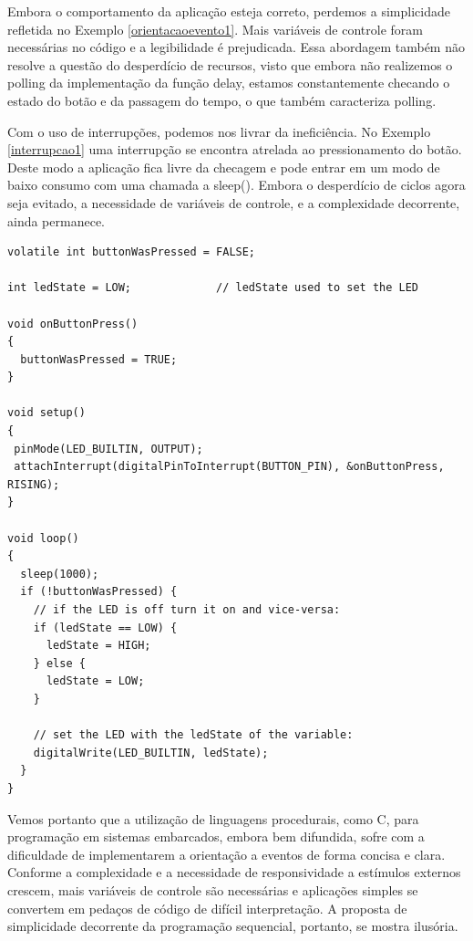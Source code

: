 \documentclass[11pt]{article}
\begin{document}
\par Embora o comportamento da aplicação esteja correto, perdemos a simplicidade refletida no Exemplo \ref{orientacaoevento1}. Mais variáveis de controle foram necessárias no código e a legibilidade é prejudicada. Essa abordagem também não resolve a questão do desperdício de recursos, visto que embora não realizemos o polling da implementação da função delay, estamos constantemente checando o estado do botão e da passagem do tempo, o que também caracteriza polling.
\par Com o uso de interrupções, podemos nos livrar da ineficiência. No Exemplo \ref{interrupcao1} uma interrupção se encontra atrelada ao pressionamento do botão. Deste modo a aplicação fica livre da checagem e pode entrar em um modo de baixo consumo com uma chamada a sleep(). Embora o desperdício de ciclos agora seja evitado, a necessidade de variáveis de controle, e a complexidade decorrente, ainda permanece.
\begin{lstlisting}[style=CStyle,label=interrupcao1,caption=Aplicação utilizando interrupção]
volatile int buttonWasPressed = FALSE;

int ledState = LOW;             // ledState used to set the LED

void onButtonPress()
{
  buttonWasPressed = TRUE;
}

void setup()
{
 pinMode(LED_BUILTIN, OUTPUT);
 attachInterrupt(digitalPinToInterrupt(BUTTON_PIN), &onButtonPress, RISING);
}

void loop()
{
  sleep(1000);
  if (!buttonWasPressed) {
    // if the LED is off turn it on and vice-versa:
    if (ledState == LOW) {
      ledState = HIGH;
    } else {
      ledState = LOW;
    }

    // set the LED with the ledState of the variable:
    digitalWrite(LED_BUILTIN, ledState);
  }
}
\end{lstlisting}
\par\par Vemos portanto que a utilização de linguagens procedurais, como C, para programação em sistemas embarcados, embora bem difundida, sofre com a dificuldade de implementarem a orientação a eventos de forma concisa e clara. Conforme a complexidade e a necessidade de responsividade a estímulos externos crescem, mais variáveis de controle são necessárias e aplicações simples se convertem em pedaços de código de difícil interpretação. A proposta de simplicidade decorrente da programação sequencial, portanto, se mostra ilusória.
\end{document}
